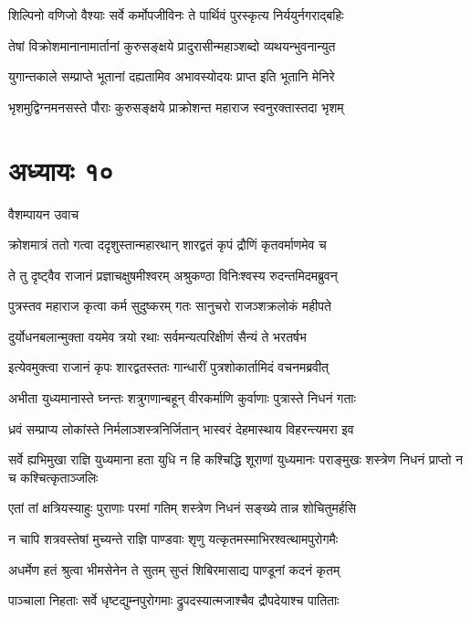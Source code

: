 \twolineshloka
{शिल्पिनो वणिजो वैश्याः सर्वे कर्मोपजीविनः}
{ते पार्थिवं पुरस्कृत्य निर्ययुर्नगराद्बहिः}


\twolineshloka
{तेषां विक्रोशमानानामार्तानां कुरुसङ्क्षये}
{प्रादुरासीन्महाञ्शब्दो व्यथयन्भुवनान्युत}


\twolineshloka
{युगान्तकाले सम्प्राप्ते भूतानां दह्यतामिव}
{अभावस्योदयः प्राप्त इति भूतानि मेनिरे}


\twolineshloka
{भृशमुद्विग्नमनसस्ते पौराः कुरुसङ्क्षये}
{प्राक्रोशन्त महाराज स्वनुरक्तास्तदा भृशम्}


\chapter{अध्यायः १०}
\twolineshloka
{वैशम्पायन उवाच}
{}


\twolineshloka
{क्रोशमात्रं ततो गत्वा ददृशुस्तान्महारथान्}
{शारद्वतं कृपं द्रौणिं कृतवर्माणमेव च}


\twolineshloka
{ते तु दृष्ट्वैव राजानं प्रज्ञाचक्षुषमीश्वरम्}
{अश्रुकण्ठा विनिःश्वस्य रुदन्तमिदमब्रुवन्}


\twolineshloka
{पुत्रस्तव महाराज कृत्वा कर्म सुदुष्करम्}
{गतः सानुचरो राजञ्शक्रलोकं महीपते}


\twolineshloka
{दुर्योधनबलान्मुक्ता वयमेव त्रयो रथाः}
{सर्वमन्यत्परिक्षीणं सैन्यं ते भरतर्षभ}


\twolineshloka
{इत्येवमुक्त्वा राजानं कृपः शारद्वतस्ततः}
{गान्धारीं पुत्रशोकार्तामिदं वचनमब्रवीत्}


\twolineshloka
{अभीता युध्यमानास्ते घ्नन्तः शत्रुगणान्बहून्}
{वीरकर्माणि कुर्वाणाः पुत्रास्ते निधनं गताः}


\twolineshloka
{ध्रवं सम्प्राप्य लोकांस्ते निर्मलाञ्शस्त्रनिर्जितान्}
{भास्वरं देहमास्थाय विहरन्त्यमरा इव}


\threelineshloka
{सर्वे ह्यभिमुखा राज्ञि युध्यमाना हता युधि}
{न हि कश्चिद्धि शूराणां युध्यमानः पराङ्मुखः}
{शस्त्रेण निधनं प्राप्तो न च कश्चित्कृताञ्जलिः}


\twolineshloka
{एतां तां क्षत्रियस्याहुः पुराणाः परमां गतिम्}
{शस्त्रेण निधनं सङ्ख्ये तान्न शोचितुमर्हसि}


\twolineshloka
{न चापि शत्रवस्तेषां मुच्यन्ते राज्ञि पाण्डवाः}
{शृणु यत्कृतमस्माभिरश्वत्थामपुरोगमैः}


\twolineshloka
{अधर्मेण हतं श्रुत्वा भीमसेनेन ते सुतम्}
{सुप्तं शिबिरमासाद्य पाण्डूनां कदनं कृतम्}


\twolineshloka
{पाञ्चाला निहताः सर्वे धृष्टद्युम्नपुरोगमाः}
{द्रुपदस्यात्मजाश्चैव द्रौपदेयाश्च पातिताः}


